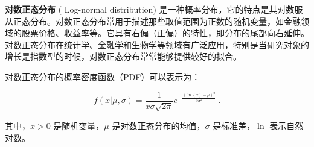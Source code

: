 
\textbf{对数正态分布} (
Log-normal distribution) 是一种概率分布，它的特点是其对数服从正态分布。对数正态分布常用于描述那些取值范围为正数的随机变量，如金融领域的股票价格、收益率等。它具有右偏（正偏）的特性，即分布的尾部向右延伸。对数正态分布在统计学、金融学和生物学等领域有广泛应用，特别是当研究对象的增长是指数型的时候，对数正态分布常常能够提供较好的拟合。

对数正态分布的概率密度函数（PDF）可以表示为：

\begin{equation}
f(x|\mu, \sigma) = \frac{1}{x \sigma \sqrt{2\pi}} e^{-\frac{(\ln(x) - \mu)^2}{2\sigma^2}}~.
\end{equation}

其中，\( x > 0 \) 是随机变量，\( \mu \) 是对数正态分布的均值，\( \sigma \) 是标准差，\( \ln \) 表示自然对数。

